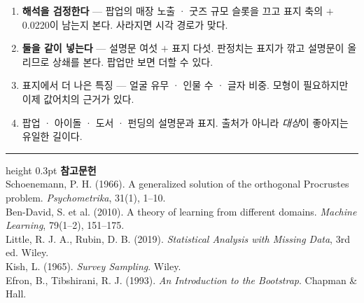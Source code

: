 \documentclass[10pt]{article}
\begin{document}
\begin{enumerate}[leftmargin=1.3em,itemsep=0.15em]
\item \textbf{해석을 검정한다} --- 팝업의 매장 노출 · 굿즈 규모 슬롯을 끄고
      표지 축의 $+$0.0220이 남는지 본다. 사라지면 시각 경로가 맞다.
\item \textbf{둘을 같이 넣는다} --- 설명문 여섯 $+$ 표지 다섯. 판정치는 표지가
      깎고 설명문이 올리므로 상쇄를 본다. 팝업만 보면 더할 수 있다.
\item 표지에서 더 나은 특징 --- 얼굴 유무 · 인물 수 · 글자 비중. 모형이
      필요하지만 이제 값어치의 근거가 있다.
\item 팝업 · 아이돌 · 도서 · 펀딩의 설명문과 표지. 출처가 아니라 \emph{대상}이
      좋아지는 유일한 길이다.
\end{enumerate}

\vspace{0.6em}
\hrule height 0.3pt
\vspace{0.5em}
{\footnotesize
\textbf{참고문헌}\\[0.3em]
Schoenemann, P. H. (1966). A generalized solution of the orthogonal Procrustes
problem. \emph{Psychometrika}, 31(1), 1--10.\\[0.15em]
Ben-David, S. et al. (2010). A theory of learning from different domains.
\emph{Machine Learning}, 79(1--2), 151--175.\\[0.15em]
Little, R. J. A., Rubin, D. B. (2019). \emph{Statistical Analysis with Missing
Data}, 3rd ed. Wiley.\\[0.15em]
Kish, L. (1965). \emph{Survey Sampling}. Wiley.\\[0.15em]
Efron, B., Tibshirani, R. J. (1993). \emph{An Introduction to the Bootstrap}.
Chapman \& Hall.
}
\end{document}
